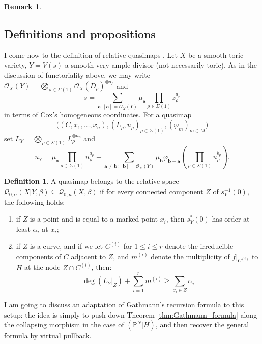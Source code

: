 \documentclass[11pt]{amsart}
\newcommand{\Q}[4]{\mathcal{Q}_{#1,#2}(#3,#4)}
\newcommand{\PP}{\mathbb P}
\newcommand{\OO}{\mathcal{O}}
\theoremstyle{definition}
\theoremstyle{definition}
\newtheorem{definition}[thm]{Definition}
\newtheorem{rmk}[thm]{Remark}
\begin{document}
\begin{rmk}
\end{rmk}

\subsection{Definitions and propositions}
I come now to the definition of relative quasimaps \cite[\S 2.3]{BN}. Let $X$ be a smooth toric variety, $Y=V(s)$ a smooth very ample divisor (not necessarily toric). As in the discussion of functoriality above, we may write $\OO_X(Y)=\bigotimes_{\rho\in\Sigma(1)}\OO_X(D_\rho)^{\otimes a_\rho}$ and 
\[s=\sum_{\mathbf a:[\mathbf a]=\OO_X(Y)}\mu_{\mathbf a}\prod_{\rho\in\Sigma(1)}z_\rho^{a_\rho}\]
in terms of Cox's homogeneous coordinates. For a quasimap 
\[ \Big((C,x_1,\ldots,x_n), (L_\rho,u_\rho)_{\rho \in \Sigma(1)}, (\varphi_m)_{m \in M}\Big) \]
set $L_Y=\bigotimes_{\rho\in\Sigma(1)}L_\rho^{\otimes a_\rho}$ and
\[u_Y=\mu_{\mathbf a}\prod_{\rho\in\Sigma(1)}u_\rho^{a_\rho}+\sum_{\mathbf a\neq \mathbf b:[\mathbf b]=\OO_X(Y)}\mu_{\mathbf b}\varphi_{\mathbf b-\mathbf a}\left(\prod_{\rho\in\Sigma(1)}u_\rho^{b_\rho}\right).\]
\begin{definition}
 A quasimap belongs to the relative space $\Q{0}{\alpha}{X|Y}{\beta}\subseteq \Q{0}{n}{X}{\beta}$ if for every connected component $Z$ of $s_Y^{-1}(0)$, the following holds:
\begin{enumerate}
\item if $Z$ is a point and is equal to a marked point $x_i$, then $s_Y^*(0)$ has order at least $\alpha_i$ at $x_i$;
\item if $Z$ is a curve, and if we let $C^{(i)}$ for $1 \leq i \leq r$ denote the irreducible components of $C$ adjacent to $Z$, and $m^{(i)}$ denote the multiplicity of $f|_{C^{(i)}}$ to $H$ at the node $Z \cap C^{(i)}$, then:
\begin{equation} \label{Relative quasimap internal component inequality} \deg(L_{Y}|_Z) + \sum_{i=1}^r m^{(i)} \geq \sum_{x_i \in Z} \alpha_i \end{equation}
\end{enumerate}
\end{definition}

I am going to discuss an adaptation of Gathmann's recursion formula to this setup: the idea is simply to push down Theorem \ref{thm:Gathmann_formula} along the collapsing morphism in the case of $(\PP^N|H)$, and then recover the general formula by virtual pullback.
\end{document}
